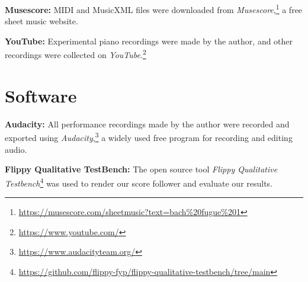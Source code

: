 \textbf{Musescore:} MIDI and MusicXML files were downloaded from \textit{Musescore},\footnote{\href{https://musescore.com/sheetmusic?text=bach\%20fugue\%201}{https://musescore.com/sheetmusic?text=bach\%20fugue\%201}} a free sheet music website. 

\textbf{YouTube:} Experimental piano recordings were made by the author, and other recordings were collected on \textit{YouTube}.\footnote{\href{https://www.youtube.com/}{https://www.youtube.com/}}

\section{Software}
\textbf{Audacity:} All performance recordings made by the author were recorded and exported using \textit{Audacity},\footnote{\href{https://www.audacityteam.org/}{https://www.audacityteam.org/}} a widely used free program for recording and editing audio. 

\textbf{Flippy Qualitative TestBench:} The open source tool \textit{Flippy Qualitative Testbench}\footnote{\href{https://github.com/flippy-fyp/flippy-qualitative-testbench/tree/main}{https://github.com/flippy-fyp/flippy-qualitative-testbench/tree/main}} was used to render our score follower and evaluate our results. 